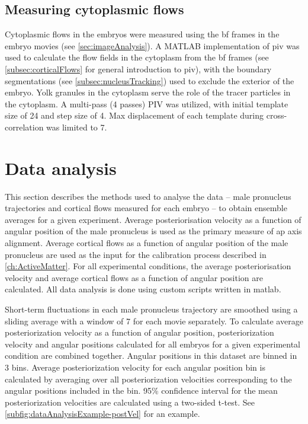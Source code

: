 \subsection{Measuring cytoplasmic flows}\label{subsec:cytoFlows} %
Cytoplasmic flows in the embryos were measured using the \ac{bf} frames in the embryo movies (see \autoref{sec:imageAnalysis}). A MATLAB implementation of \ac{piv} \citep{thielicke2014pivlab} was used to calculate the flow fields in the cytoplasm from the \ac{bf} frames (see \autoref{subsec:corticalFlows} for general introduction to \ac{piv}), with the boundary segmentations (see \autoref{subsec:nucleusTracking}) used to exclude the exterior of the embryo. Yolk granules in the cytoplasm serve the role of the tracer particles in the cytoplasm. A multi-pass (4 passes) PIV was utilized, with initial template size of \SI{24}{\pixels} and step size of \SI{4}{\pixels}. Max displacement of each template during cross-correlation was limited to \SI{7}{\pixels}. 

\section{Data analysis}\label{sec:statAnalysis}
This section describes the methods used to analyse the data -- male pronucleus trajectories and cortical flows measured for each embryo -- to obtain ensemble averages for a given experiment. Average posteriorisation velocity as a function of angular position of the male pronucleus is used as the primary measure of \ac{ap} axis alignment. Average cortical flows as a function of angular position of the male pronucleus are used as the input for the calibration process described in \autoref{ch:ActiveMatter}. For all experimental conditions, the average posteriorisation velocity and average cortical flows as a function of angular position are calculated. All data analysis is done using custom scripts written in \ac{matlab}.

Short-term fluctuations in each male pronucleus trajectory are smoothed using a sliding average with a window of \SI{7}{\frames} for each movie separately. To calculate average posteriorization velocity as a function of angular position, posteriorization velocity and angular positions calculated for all embryos for a given experimental condition are combined together. Angular positions in this dataset are binned in \SI{3}{\unitAngle} bins. Average posteriorization velocity for each angular position bin is calculated by averaging over all posteriorization velocities corresponding to the angular positions included in the bin. \num{95}\% confidence interval for the mean posteriorization velocities are calculated using a two-sided t-test. See \autoref{subfig:dataAnalysisExample-postVel} for an example.

